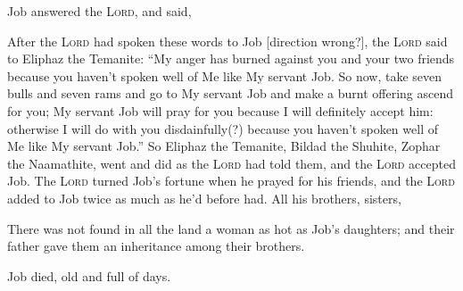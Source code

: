 
\begin{inparaenum}
     Job answered the \textsc{Lord}, and said,\smallskip%
    
    
    
    
    
    
     After the \textsc{Lord} had spoken these words to Job [direction wrong?], the \textsc{Lord} said to Eliphaz the Temanite: ``My anger has burned against you and your two friends because you haven't spoken well of Me like My servant Job.%
     So now, take seven bulls and seven rams and go to My servant Job and make a burnt offering ascend for you; My servant Job will pray for you because I will definitely accept him: otherwise I will do with you disdainfully(?) because you haven't spoken well of Me like My servant Job.''%
     So Eliphaz the Temanite, Bildad the Shuhite, Zophar the Naamathite, went and did as the \textsc{Lord} had told them, and the \textsc{Lord} accepted Job.%
     The \textsc{Lord} turned Job's fortune when he prayed for his friends, and the \textsc{Lord} added to Job twice as much as he'd before had.%
     All his brothers, sisters, %
    
     There was not found in all the land a woman as hot as Job's daughters; and their father gave them an inheritance among their brothers.%
    
     Job died, old and full of days.%
\end{inparaenum}
